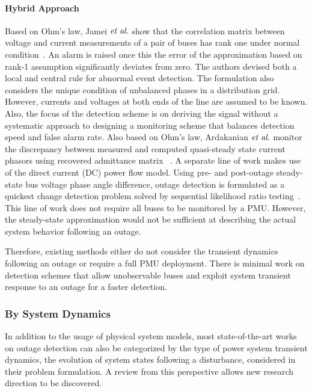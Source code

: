\paragraph{Hybrid Approach}
Based on Ohm's law, Jamei $\textit{et al}.$ show that the correlation matrix between voltage and current measurements of a pair of buses has rank one under normal condition~\cite{Jamei2017a}. An alarm is raised once this the error of the approximation based on rank-1 assumption significantly deviates from zero. The authors devised both a local and central rule for abnormal event detection. The formulation also considers the unique condition of unbalanced phases in a distribution grid. However, currents and voltages at both ends of the line are assumed to be known. Also, the focus of the detection scheme is on deriving the signal without a systematic approach to designing a monitoring scheme that balances detection speed and false alarm rate.
Also based on Ohm's law, Ardakanian $\textit{et al}.$ monitor the discrepancy between measured and computed quasi-steady state current phasors using recovered admittance matrix ~\cite{Ardakanian2019a}. 
A separate line of work makes use of the direct current (DC) power flow model. Using pre- and post-outage steady-state bus voltage phase angle difference, outage detection is formulated as a quickest change detection problem solved by sequential likelihood ratio testing~\cite{Chen2016,Babakmehr2016}. 
This line of work does not require all buses to be monitored by a PMU. However, the steady-state approximation would not be sufficient at describing the actual system behavior following an outage.

Therefore, existing methods either do not consider the transient dynamics following an outage or require a full PMU deployment. There is minimal work on detection schemes that allow unobservable buses and exploit system transient response to an outage for a faster detection.


\subsubsection{By System Dynamics} %
\label{ssub:by_dynamics}

In addition to the usage of physical system models, most state-of-the-art works on outage detection can also be categorized by the type of power system transient dynamics, the evolution of system states following a disturbance, considered in their problem formulation. A review from this perspective allows new research direction to be discovered. 

